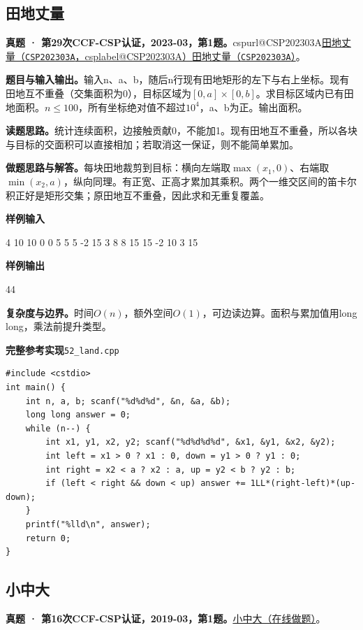 \documentclass[UTF8,11pt,a4paper,fontset=none]{ctexart}
\makeatletter
\newcommand{\csp}[2]{\ifcsname cspurl@#1\endcsname\href{\csname cspurl@#1\endcsname}{#2（\texttt{#1}，\csname csplabel@#1\endcsname）}\else\href{https://oj.shumeng.tech/p/#1}{#2（\texttt{#1}）}\fi}
\makeatother
\begin{document}
\subsection{田地丈量}
\textbf{真题 · 第29次CCF-CSP认证，2023-03，第1题。}\csp{CSP202303A}{田地丈量}。

\noindent\textbf{题目与输入输出。}输入n、a、b，随后n行现有田地矩形的左下与右上坐标。现有田地互不重叠（交集面积为0），目标区域为$[0,a]\times[0,b]$。求目标区域内已有田地面积。$n\le100$，所有坐标绝对值不超过$10^4$，a、b为正。输出面积。

\noindent\textbf{读题思路。}统计连续面积，边接触贡献0，不能加1。现有田地互不重叠，所以各块与目标的交面积可以直接相加；若取消这一保证，则不能简单累加。

\noindent\textbf{做题思路与解答。}每块田地裁剪到目标：横向左端取$\max(x_1,0)$、右端取$\min(x_2,a)$，纵向同理。有正宽、正高才累加其乘积。两个一维交区间的笛卡尔积正好是矩形交集；原田地互不重叠，因此求和无重复覆盖。
\begin{tcolorbox}[samplebox,title={输入输出样例}]
\textbf{样例输入}
\begin{Sample}
4 10 10
0 0 5 5
5 -2 15 3
8 8 15 15
-2 10 3 15
\end{Sample}
\tcblower
\textbf{样例输出}
\begin{Sample}
44
\end{Sample}
\end{tcolorbox}

\noindent\textbf{复杂度与边界。}时间$O(n)$，额外空间$O(1)$，可边读边算。面积与累加值用long long，乘法前提升类型。
\par\noindent\begin{minipage}{\linewidth}
\textbf{完整参考实现}\quad\texttt{52\_land.cpp}
\begin{lstlisting}
#include <cstdio>
int main() {
    int n, a, b; scanf("%d%d%d", &n, &a, &b);
    long long answer = 0;
    while (n--) {
        int x1, y1, x2, y2; scanf("%d%d%d%d", &x1, &y1, &x2, &y2);
        int left = x1 > 0 ? x1 : 0, down = y1 > 0 ? y1 : 0;
        int right = x2 < a ? x2 : a, up = y2 < b ? y2 : b;
        if (left < right && down < up) answer += 1LL*(right-left)*(up-down);
    }
    printf("%lld\n", answer);
    return 0;
}
\end{lstlisting}
\end{minipage}\par

\subsection{小中大}
\textbf{真题 · 第16次CCF-CSP认证，2019-03，第1题。}\href{https://www.acwing.com/problem/content/3275/}{小中大（在线做题）}。
\end{document}
